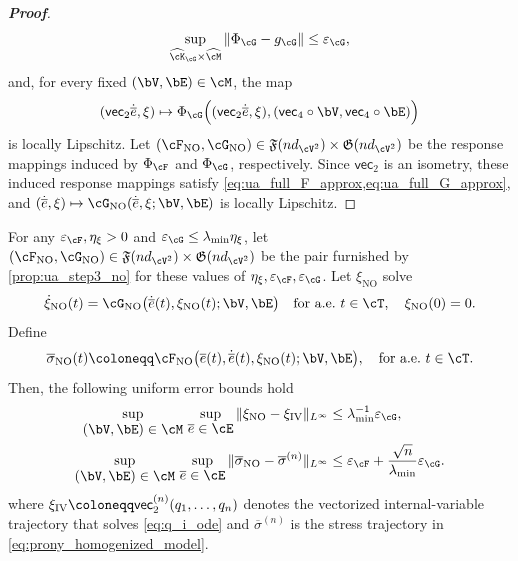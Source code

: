 \begin{proof}[\bf Proof]
\begin{equation*}
\sup_{\widehat{\cK}_{\cG}\times\widehat{\cM}}\|\Phi_{\cG}-g_{\cG}\|\le \varepsilon_{\cG},
\end{equation*}
and, for every fixed $(\bV,\bE)\in\cM$, the map
\begin{equation*}
(\mathsf{vec}_2\dot{\overline e},\xi)\mapsto \Phi_{\cG}\Bigl((\mathsf{vec}_2\dot{\overline e},\xi),(\mathsf{vec}_4\circ\bV,\mathsf{vec}_4\circ\bE)\Bigr)
\end{equation*}
is locally Lipschitz. Let $(\cF_{\mathrm{NO}},\cG_{\mathrm{NO}})\in \mathfrak{F}(nd_{\cV^2})\times \mathfrak{G}(nd_{\cV^2})$ be the response mappings induced by $\Phi_{\cF}$ and $\Phi_{\cG}$, respectively. Since $\mathsf{vec}_2$ is an isometry, these induced response mappings satisfy \cref{eq:ua_full_F_approx,eq:ua_full_G_approx}, and $(\dot{\overline e},\xi)\mapsto \cG_{\mathrm{NO}}(\dot{\overline e},\xi;\bV,\bE)$ is locally Lipschitz.
\end{proof}

\begin{lemma}\label{lem:ua_step3_stability}
For any $\varepsilon_{\cF},\eta_{\xi}>0$ and $\varepsilon_{\cG}\leq \lambda_{\min}\eta_{\xi}$, let $(\cF_{\mathrm{NO}},\cG_{\mathrm{NO}})\in \mathfrak{F}(nd_{\cV^2})\times \mathfrak{G}(nd_{\cV^2})$ be the pair furnished by \cref{prop:ua_step3_no} for these values of $\eta_{\xi},\varepsilon_{\cF},\varepsilon_{\cG}$. Let $\xi_{\mathrm{NO}}$ solve
\begin{equation*}
    \dot{\xi}_{\mathrm{NO}}(t)=\cG_{\mathrm{NO}}\big(\dot{\overline{e}}(t),\xi_{\mathrm{NO}}(t);\bV,\bE\big)\quad\text{for a.e.\ }t\in\cT,\quad
\xi_{\mathrm{NO}}(0)=0.
\end{equation*}
Define
\begin{equation*}
    \overline{\sigma}_{\mathrm{NO}}(t)\coloneqq
\cF_{\mathrm{NO}}\big(\overline{e}(t),\dot{\overline{e}}(t),\xi_{\mathrm{NO}}(t);\bV,\bE\big),\quad \text{for a.e.\ }t\in\cT.
\end{equation*}
Then, the following uniform error bounds hold
\begin{align}
\sup_{\displaystyle(\bV,\bE)\in\cM}\, \sup_{\displaystyle\overline{e}\in\cE}\|\xi_{\mathrm{NO}}-\xi_{\mathrm{IV}}\|_{L^{\infty}}
&\leq \lambda_{\min}^{-1}\varepsilon_{\cG},\label{eq:ua_full_xi_err}\\
\sup_{\displaystyle(\bV,\bE)\in\cM}\,\sup_{\displaystyle \overline{e}\in\cE}
\|\overline{\sigma}_{\mathrm{NO}}-\overline{\sigma}^{(n)}\|_{L^{\infty}}
&\leq \varepsilon_{\cF} + \frac{\sqrt{n}}{\lambda_{\min}}\varepsilon_{\cG}.\label{eq:ua_full_sigma_err}
\end{align}
where $\xi_{\rm IV}\coloneqq \mathsf{vec}_2^{(n)}(q_1,\dots, q_n)$ denotes the vectorized internal-variable trajectory that solves \cref{eq:q_i_ode} and $\overline{\sigma}^{(n)}$ is the stress trajectory in \cref{eq:prony_homogenized_model}.
\end{lemma}

